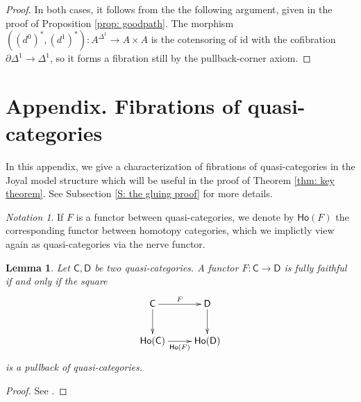 \documentclass{proc-l}
\newcommand{\ho}[1]{\mathsf{Ho}(#1)}
\theoremstyle{plain}
\newtheorem{lemma}[{theorem}]{Lemma}
\theoremstyle{definition}
\theoremstyle{remark}
\newtheorem{notation}[{theorem}]{Notation}
\begin{document}
\begin{proof}
In both cases, it follows from the the following argument, given in the proof of Proposition \ref{prop: goodpath}. The morphism $((d^0)^*,(d^1)^*): A^{\Delta^1}\rightarrow A\times A$ is the cotensoring of $\mathrm{id}$ with the cofibration $\partial\Delta^1\rightarrow \Delta^1$, so it forms a fibration still  by the pullback-corner axiom.
\end{proof}

\vspace{1pc}

\renewcommand{\thesection}{B}

\section{Appendix. Fibrations of quasi-categories}%
\label{Section:B}\label{Appendix B: fibrations of quasi-categories}

\vspace{2.5pc}

In this appendix, we give a characterization of fibrations of quasi-categories in the Joyal model structure which will be useful in the proof of Theorem \ref{thm: key theorem}. See Subsection \ref{S: the gluing proof} for more details.

\begin{notation}%
\label{Notation:B.1}If $F$ is a functor  between quasi-categories, we denote by $\ho{F}$ the corresponding functor between homotopy categories, which we implictly view again as quasi-categories via the nerve functor.
\end{notation}

\begin{lemma}%
\label{Lemma:B.2}\label{pullbackff}
Let $\mathsf{C},\mathsf{D}$ be two quasi-categories. A functor $F:\mathsf{C}\rightarrow\mathsf{D}$ is fully faithful if and only if the square
\[
\xymatrix{
\mathsf{C}\ar[r]^-F\ar[d] & \mathsf{D}\ar[d] \\
\ho{\mathsf{C}}\ar[r]_-{\ho{F}} & \ho{\mathsf{D}}
}
\]
is a pullback of quasi-categories.
\end{lemma}
\begin{proof}
See \cite[Remark 1.2.11.1]{Lurie09}.
\end{proof}
\end{document}
